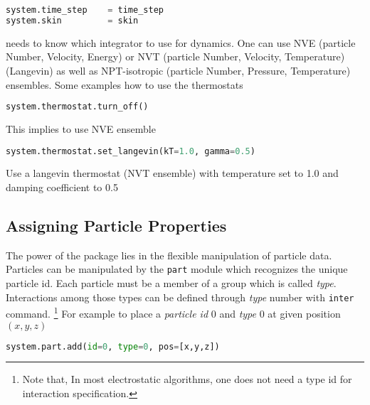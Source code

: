 \documentclass[
paper=a4,                       %
fontsize=11pt,                  %
twoside,                        %
footsepline,                    %
headsepline,                    %
headinclude=false,              %
footinclude=false,              %
pagesize,                       %
]{scrartcl}
\begin{document}
  {\small\vspace{0,2cm}
\begin{lstlisting}[language=Python,numbers=none]
system.time_step    = time_step
system.skin         = skin
\end{lstlisting}\vspace{0,2cm}
} 

\es{} needs to know which integrator to use for dynamics. One can use NVE (particle
Number, Velocity, Energy) or NVT (particle Number, Velocity, Temperature)(Langevin)
as well as NPT-isotropic (particle Number, Pressure, Temperature) ensembles. Some
examples how to use the thermostats

{\small\vspace{0,2cm}
\begin{lstlisting}[language=Python, numbers=none]
system.thermostat.turn_off()
\end{lstlisting}}\vspace{0,2cm}
\noindent This implies to use NVE ensemble
{\small\vspace{0,2cm}
\begin{lstlisting}[language=Python, numbers=none]
system.thermostat.set_langevin(kT=1.0, gamma=0.5)
\end{lstlisting}}\vspace{0,2cm}
\noindent Use a langevin thermostat (NVT ensemble) with temperature set to 1.0 and damping coefficient to 0.5 



\subsection{Assigning Particle Properties}\label{sec:partprop}
The power of the \es{} package lies in the flexible manipulation of particle
data. Particles can be manipulated by the \lstinline|part| module which recognizes the unique particle 
   id. Each particle must be a member of a group which is called \emph{type}. 
Interactions among those types can be defined through \emph{type} number 
   with \lstinline|inter| command.
   \footnote{Note that, In most electrostatic algorithms, one does not need a type id for interaction specification.}
   For example to place a \emph{particle id} 0 and \emph{type} 0 at given 
   position $(x,y,z)$
   
{\small\vspace{0,2cm}
\begin{lstlisting}[language=Python, numbers=none]
system.part.add(id=0, type=0, pos=[x,y,z])
\end{lstlisting}\vspace{0,2cm}
}
\end{document}
